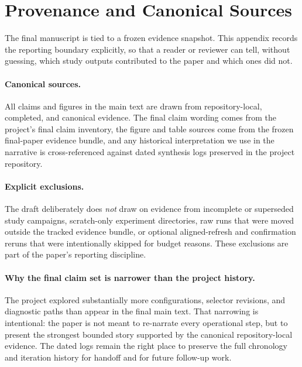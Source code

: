 \section{Provenance and Canonical Sources}

The final manuscript is tied to a frozen evidence snapshot. This appendix records the reporting boundary explicitly, so that a reader or reviewer can tell, without guessing, which study outputs contributed to the paper and which ones did not.

\paragraph{Canonical sources.} All claims and figures in the main text are drawn from repository-local, completed, and canonical evidence. The final claim wording comes from the project's final claim inventory, the figure and table sources come from the frozen final-paper evidence bundle, and any historical interpretation we use in the narrative is cross-referenced against dated synthesis logs preserved in the project repository.

\paragraph{Explicit exclusions.} The draft deliberately does \emph{not} draw on evidence from incomplete or superseded study campaigns, scratch-only experiment directories, raw runs that were moved outside the tracked evidence bundle, or optional aligned-refresh and confirmation reruns that were intentionally skipped for budget reasons. These exclusions are part of the paper's reporting discipline.

\paragraph{Why the final claim set is narrower than the project history.} The project explored substantially more configurations, selector revisions, and diagnostic paths than appear in the final main text. That narrowing is intentional: the paper is not meant to re-narrate every operational step, but to present the strongest bounded story supported by the canonical repository-local evidence. The dated logs remain the right place to preserve the full chronology and iteration history for handoff and for future follow-up work.
